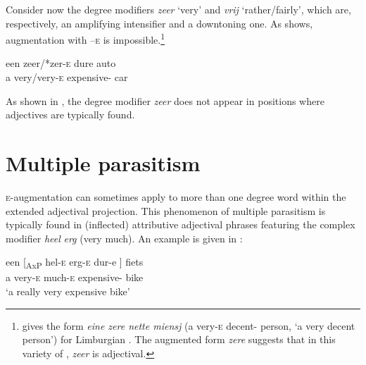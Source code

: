 \documentclass[output=paper]{langsci/langscibook}
\begin{document}
Consider now the degree modifiers \emph{zeer} \enquote*{very} and \emph{vrij}
‘rather/fairly’, which are, respectively, an amplifying intensifier and a
downtoning one. As  shows, augmentation with –\textsc{e} is
impossible.\footnote{\citet{Verdenius1939} gives the form \emph{eine zere nette
miensj} (a very-\textsc{e} decent-\Agr{} person, \enquote*{a very decent person}) for
Limburgian . The augmented form \emph{zere} suggests that in this
variety of , \emph{zeer} is adjectival.}

\ea%
    \label{ex:key:18.15}
    \sn
    \gll een   zeer/*zer-\textsc{e}    dure                      auto\\
        a        very/very-\textsc{e}    expensive-\Agr{}    car\\
    \glt
\z

As shown in , the degree modifier \emph{zeer} does not appear in
positions where adjectives are typically found.

\ea%
    \label{ex:key:18.16}
	\z
\z

\section{Multiple parasitism}\label{sec:key:18.4}

\textsc{e-}augmentation can sometimes apply to more than one degree word within
the extended adjectival projection. This phenomenon of multiple parasitism is
typically found in (inflected) attributive adjectival phrases featuring the
complex modifier \emph{heel} \emph{erg} (very much). An example is given in
:

\ea%
    \label{ex:key:18.17}
    \sn
    \gll  een    [\textsubscript{AxP} hel-\textsc{e}    erg-\textsc{e}
    dur-e ]          fiets\\
    a   {}         very-\textsc{e}    much-\textsc{e}  expensive-\Agr{} {} bike\\
    \glt \enquote*{a really very expensive bike}
\z
\end{document}
